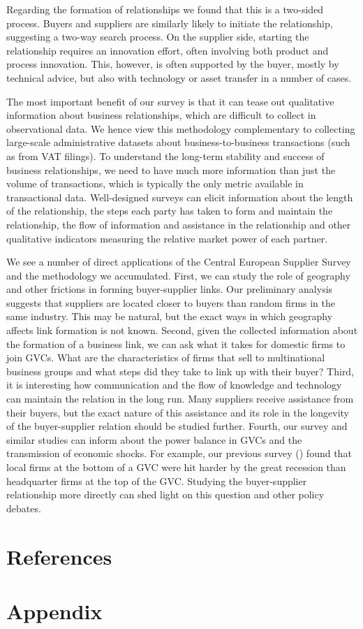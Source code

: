 \documentclass[final, dvipsnames, authoryear,12pt]{elsarticle}
\begin{document}
Regarding the formation of relationships we found that this is a two-sided process. Buyers and suppliers are similarly likely to initiate the relationship, suggesting a two-way search process. On the supplier side, starting the relationship requires an innovation effort, often involving both product and process innovation. This, however, is often supported by the buyer, mostly by technical advice, but also with technology or asset transfer in a number of cases.

The most important benefit of our survey is that it can tease out qualitative information about business relationships, which are difficult to collect in observational data. We hence view this methodology complementary to collecting large-scale administrative datasets about business-to-business transactions (such as from VAT filings). To understand the long-term stability and success of business relationships, we need to have much more information than just the volume of transactions, which is typically the only metric available in transactional data. Well-designed surveys can elicit information about the length of the relationship, the steps each party has taken to form and maintain the relationship, the flow of information and assistance in the relationship and other qualitative indicators measuring the relative market power of each partner.

We see a number of direct applications of the Central European Supplier Survey and the methodology we accumulated. First, we can study the role of geography and other frictions in forming buyer-supplier links. Our preliminary analysis suggests that suppliers are located closer to buyers than random firms in the same industry. This may be natural, but the exact ways in which geography affects link formation is not known. Second, given the collected information about the formation of a business link, we can ask what it takes for domestic firms to join GVCs. What are the characteristics of firms that sell to multinational business groups and what steps did they take to link up with their buyer? Third, it is interesting how communication and the flow of knowledge and technology can maintain the relation in the long run. Many suppliers receive assistance from their buyers, but the exact nature of this assistance and its role in the longevity of the buyer-supplier relation should be studied further. Fourth, our survey and similar studies can inform about the power balance in GVCs and the transmission of economic shocks. For example, our previous survey (\cite{still_standing}) found that local firms at the bottom of a GVC were hit harder by the great recession than headquarter firms at the top of the GVC. Studying the buyer-supplier relationship more directly can shed light on this question and other policy debates.

\section{References}




\appendix
\section{Appendix}
\end{document}

